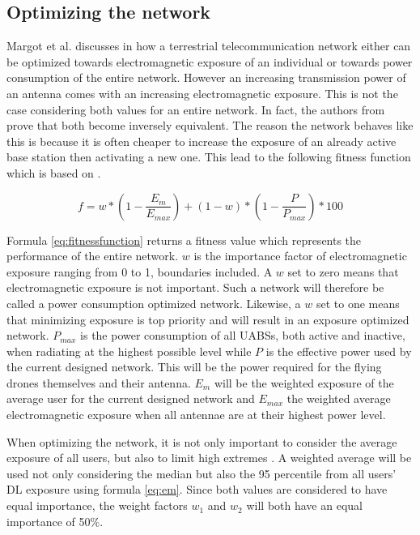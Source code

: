 \documentclass[twocolumn]{phdsymp} %
\begin{document}
\subsection{Optimizing the network}

Margot et al. discusses in \cite{J1} how a terrestrial  telecommunication network either can  be optimized towards electromagnetic 
exposure of an individual or towards power consumption of the entire network. 
However an increasing transmission power of an antenna comes with an increasing electromagnetic exposure. This is not the case considering
both values for an entire network. In fact, the authors from   prove that both become inversely equivalent.
The reason the network behaves like this is because it is often cheaper to increase the exposure of an already active base station 
then activating a new one. 
This lead to the following fitness function which is based on \cite{J1}.

\begin{equation} 
f = w * \left(1 - \frac{E_m}{E_{max}}\right) + (1 - w)*\left(1 - \frac{P}{P_{max}}\right) * 100
\label{eq:fitnessfunction}
\end{equation}

Formula \ref{eq:fitnessfunction} returns a fitness value which represents the performance of the entire network. 
$w$ is the importance factor of electromagnetic exposure ranging from 0 to 1, boundaries included. A $w$ set to zero means that electromagnetic 
exposure is not important. Such a network will therefore be called a power consumption optimized network. 
Likewise, a $w$ set to one means that minimizing exposure is top priority and will result in an exposure optimized  network. $P_{max}$ is the power consumption of all UABSs, both active and inactive, when radiating at the highest possible level 
while $P$ is the effective power used by the current designed network. 
This will be the power required for the flying drones themselves and their antenna.
$E_m$ will be the weighted exposure of the average user for the current designed network and $E_{max}$ the weighted average electromagnetic exposure when all antennae are at their highest power level.

When optimizing the network, it is not only important to consider the average exposure of all users, but also to limit high extremes \cite{J1}. A weighted average 
will be used not only considering the median but also the 95 percentile from all users' \gls{DL} exposure using formula \ref{eq:em}. 
Since both values are considered to have equal importance, the weight factors $w_1$ and $w_2$ will both have an equal importance of 50\%. 
\end{document}
